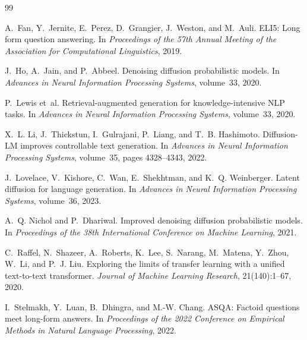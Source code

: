 \documentclass{article}
\begin{document}
\begin{thebibliography}{99}

A.~Fan, Y.~Jernite, E.~Perez, D.~Grangier, J.~Weston, and M.~Auli.
\newblock ELI5: Long form question answering.
\newblock In \emph{Proceedings of the 57th Annual Meeting of the Association for Computational Linguistics}, 2019.

J.~Ho, A.~Jain, and P.~Abbeel.
\newblock Denoising diffusion probabilistic models.
\newblock In \emph{Advances in Neural Information Processing Systems}, volume~33, 2020.

P.~Lewis et~al.
\newblock Retrieval-augmented generation for knowledge-intensive NLP tasks.
\newblock In \emph{Advances in Neural Information Processing Systems}, volume~33, 2020.

X.~L. Li, J.~Thickstun, I.~Gulrajani, P.~Liang, and T.~B. Hashimoto.
\newblock Diffusion-LM improves controllable text generation.
\newblock In \emph{Advances in Neural Information Processing Systems}, volume~35, pages 4328--4343, 2022.

J.~Lovelace, V.~Kishore, C.~Wan, E.~Shekhtman, and K.~Q. Weinberger.
\newblock Latent diffusion for language generation.
\newblock In \emph{Advances in Neural Information Processing Systems}, volume~36, 2023.

A.~Q. Nichol and P.~Dhariwal.
\newblock Improved denoising diffusion probabilistic models.
\newblock In \emph{Proceedings of the 38th International Conference on Machine Learning}, 2021.

C.~Raffel, N.~Shazeer, A.~Roberts, K.~Lee, S.~Narang, M.~Matena, Y.~Zhou, W.~Li, and P.~J. Liu.
\newblock Exploring the limits of transfer learning with a unified text-to-text transformer.
\newblock \emph{Journal of Machine Learning Research}, 21(140):1--67, 2020.

I.~Stelmakh, Y.~Luan, B.~Dhingra, and M.-W. Chang.
\newblock ASQA: Factoid questions meet long-form answers.
\newblock In \emph{Proceedings of the 2022 Conference on Empirical Methods in Natural Language Processing}, 2022.


\end{thebibliography}
\end{document}
